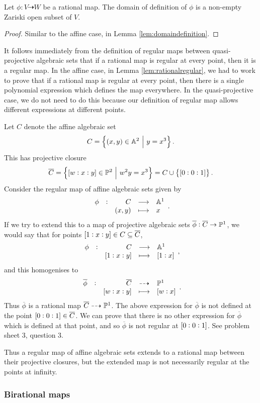 \begin{lemma}
Let $ \phi : V \dashrightarrow W $ be a rational map. The domain of definition of $ \phi $ is a non-empty Zariski open subset of $ V $.
\end{lemma}

\begin{proof}
Similar to the affine case, in Lemma \ref{lem:domaindefinition}.
\end{proof}

It follows immediately from the definition of regular maps between quasi-projective algebraic sets that if a rational map is regular at every point, then it is a regular map. In the affine case, in Lemma \ref{lem:rationalregular}, we had to work to prove that if a rational map is regular at every point, then there is a single polynomial expression which defines the map everywhere. In the quasi-projective case, we do not need to do this because our definition of regular map allows different expressions at different points.

\begin{example*}
Let $ C $ denote the affine algebraic set
$$ C = \cbr{\br{x, y} \in \AA^2 \st y = x^3}. $$
This has projective closure
$$ \overline{C} = \cbr{\sbr{w : x : y} \in \PP^2 \st w^2y = x^3} = C \cup \cbr{\sbr{0 : 0 : 1}}. $$
Consider the regular map of affine algebraic sets given by
$$ \function[\phi]{C}{\AA^1}{\br{x, y}}{x}. $$
If we try to extend this to a map of projective algebraic sets $ \overline{\phi} : \overline{C} \to \mathbb{P}^1 $, we would say that for points $ \sbr{1 : x : y} \in C \subseteq \overline{C} $,
$$ \function[\phi]{C}{\AA^1}{\sbr{1 : x : y}}{\sbr{1 : x}}, $$
and this homogenises to
$$ \rational[\overline{\phi}]{\overline{C}}{\PP^1}{\sbr{w : x : y}}{\sbr{w : x}}. $$
Thus $ \overline{\phi} $ is a rational map $ \overline{C} \dashrightarrow \mathbb{P}^1 $. The above expression for $ \overline{\phi} $ is not defined at the point $ \sbr{0 : 0 : 1} \in \overline{C} $. We can prove that there is no other expression for $ \overline{\phi} $ which is defined at that point, and so $ \overline{\phi} $ is not regular at $ \sbr{0 : 0 : 1} $. See problem sheet $ 3 $, question $ 3 $.
\end{example*}

Thus a regular map of affine algebraic sets extends to a rational map between their projective closures, but the extended map is not necessarily regular at the points at infinity.

\pagebreak

\subsubsection{Birational maps}

